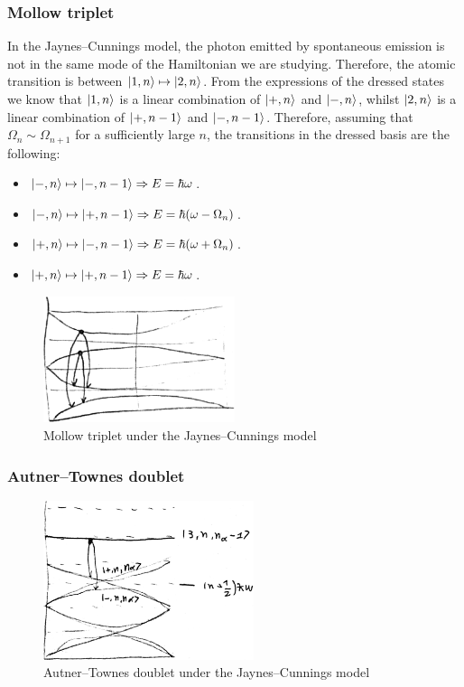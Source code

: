\subsubsection*{Mollow triplet}
In the Jaynes--Cunnings model, the photon emitted by spontaneous emission is not in the same mode of the Hamiltonian we are studying. Therefore, the atomic transition is between $\ket{1, n} \mapsto \ket{2, n}$. From the expressions of the dressed states we know that $\ket{1, n}$ is a linear combination of $\ket{+, n}$ and $\ket{-, n}$, whilst $\ket{2, n}$ is a linear combination of $\ket{+, n-1}$ and $\ket{-, n-1}$. Therefore, assuming that $\Omega_{n} \sim \Omega_{n+1}$ for a sufficiently large $n$, the transitions in the dressed basis are the following:
\begin{itemize}
	\item $\ket{-, n} \mapsto \ket{-, n-1} \Rightarrow E = \hbar \omega$.
	\item $\ket{-, n} \mapsto \ket{+, n-1} \Rightarrow E = \hbar (\omega - \Omega_{n})$.
	\item $\ket{+, n} \mapsto \ket{-, n-1} \Rightarrow E = \hbar (\omega + \Omega_{n})$.
	\item $\ket{+, n} \mapsto \ket{+, n-1} \Rightarrow E = \hbar \omega$.
\end{itemize}

\begin{figure}[H]
	\centering
	\includegraphics[width=0.5\textwidth]{./images/5-jc-mollow-triplet}
	\caption{Mollow triplet under the Jaynes--Cunnings model}
	\label{fig:jc-mollow-triplet}
\end{figure}

\subsubsection*{Autner--Townes doublet}
\begin{figure}[H]
	\centering
	\includegraphics[width=0.55\textwidth]{./images/5-jc-autler-townes-doublet}
	\caption{Autner--Townes doublet under the Jaynes--Cunnings model}
	\label{fig:jc-autler-townes-doublet}
\end{figure}

